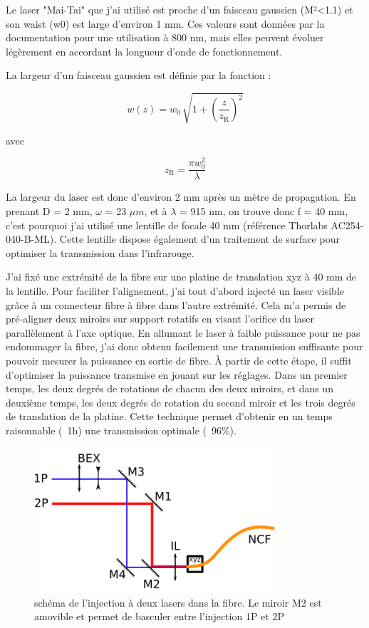 Le laser "Mai-Tai" que j'ai utilisé est proche d'un faisceau gaussien (M²<1.1) et son waist (w0) est large d'environ 1 mm. Ces valeurs sont données par la documentation pour une utilisation à 800 nm, mais elles peuvent évoluer légèrement en accordant la longueur d'onde de fonctionnement.

La largeur d'un faisceau gaussien est définie par la fonction :

$$
w(z) = w_0 \, \sqrt{ 1+ {\left( \frac{z}{z_\mathrm{R}} \right)}^2 }
$$

avec

$$
z_\mathrm{R} = \frac{\pi w_0^2 }{\lambda}
$$

La largeur du laser est donc d'environ 2 mm après un mètre de propagation. En prenant D = 2 mm, $\omega$ = 23 $\mu m$, et à $\lambda$ = 915 nm, on trouve donc f = 40 mm, c'est pourquoi j'ai utilisé une lentille de focale 40 mm (référence Thorlabs AC254-040-B-ML). Cette lentille dispose également d'un traitement de surface pour optimiser la transmission dans l'infrarouge.




J'ai fixé une extrémité de la fibre sur une platine de translation xyz à 40 mm de la lentille. Pour faciliter l'alignement, j'ai tout d'abord injecté un laser visible grâce à un connecteur fibre à fibre dans l'autre extrémité. Cela m'a permis de pré-aligner deux miroirs sur support rotatifs en visant l'orifice du laser parallèlement à l'axe optique. En allumant le laser à faible puissance pour ne pas endommager la fibre, j'ai donc obtenu facilement une transmission suffisante pour pouvoir mesurer la puissance en sortie de fibre. À partir de cette étape, il suffit d'optimiser la puissance transmise en jouant sur les réglages. Dans un premier temps, les deux degrés de rotations de chacun des deux miroirs, et dans un deuxième temps, les deux degrés de rotation du second miroir et les trois degrés de translation de la platine. Cette technique permet d'obtenir en un temps raisonnable (~1h) une transmission optimale (~96\%).

\begin{figure}
\centering
\includegraphics[width=0.8\textwidth]{./files/injection.svg.png}
\caption{schéma de l'injection à deux lasers dans la fibre. Le miroir M2 est amovible et permet de basculer entre l'injection 1P et 2P}
\end{figure}

